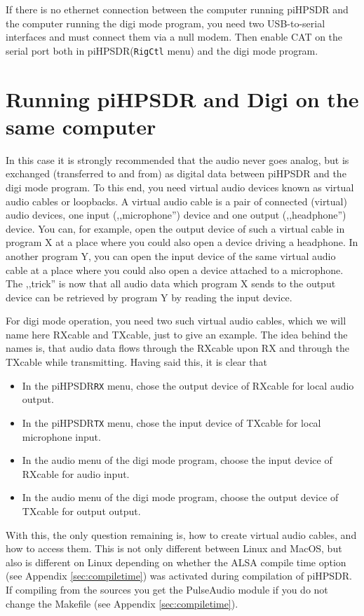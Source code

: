 \documentclass[12pt]{book}
\def\bltt#1{\texttt{\color{blue}#1}}
\def\pH{pi\-HPSDR\xspace}
\begin{document}
If there is no ethernet connection between the computer running \pH and the computer
running the digi mode program, you need two USB-to-serial interfaces and must connect them
via a null modem. Then enable CAT on the serial port both in \pH (\bltt{RigCtl} menu) and the
digi mode program.

\section[\pH and Digi on same computer]{Running \pH and Digi on the same computer}
In this case it is strongly recommended that the audio never goes analog, but is
exchanged (transferred to and from)
as digital data between \pH and the digi mode program. To this end, you need
virtual audio devices known as {\color{red} virtual audio cables} or {\color{red}
loopbacks}. A virtual audio cable is a pair of connected (virtual) audio devices,
one input (,,microphone'') device and one output (,,headphone'') device. You can,
for example, open the output device of such a virtual cable in program X at a place
where you could also open a device driving a headphone. In another program Y, you can
open the input device of the same virtual audio cable at a place where you could also
open a device attached to a microphone. The ,,trick'' is now that all audio data which
program X sends to the output device can be retrieved by program Y by reading the input device.



For digi mode operation, you need two such virtual audio cables, which we will name here
RXcable and TXcable, just to give an example. The idea behind the names is, that audio data
flows through the RXcable upon RX and through the TXcable while transmitting. Having said this,
it is clear that

\begin{itemize}
\item{In the \pH \bltt{RX} menu, chose the output device of RXcable for local audio output.}
\item{In the \pH \bltt{TX} menu, chose the input device of TXcable for local microphone input.}
\item{In the audio menu of the digi mode program, choose the input device of RXcable for audio input.}
\item{In the audio menu of the digi mode program, choose the output device of TXcable for output output.}
\end{itemize}

With this, the only question remaining is, how to create virtual audio cables, and how to access them.
This is not only different between Linux and MacOS, but also is different on Linux depending on
whether the ALSA compile time option (see Appendix \ref{sec:compiletime}) was activated during
compilation of \pH. If compiling from the sources you get the PulseAudio module if you
do not change the Makefile (see Appendix \ref{sec:compiletime}).
\end{document}
